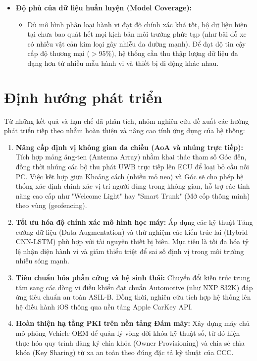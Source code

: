 \begin{itemize}
    \item \textbf{Độ phủ của dữ liệu huấn luyện (Model Coverage):}
    \begin{itemize}
        \item Dù mô hình phân loại hành vi đạt độ chính xác khá tốt, bộ dữ liệu hiện tại chưa bao quát hết mọi kịch bản môi trường phức tạp (như bãi đỗ xe có nhiều vật cản kim loại gây nhiễu đa đường mạnh). Để đạt độ tin cậy cấp độ thương mại ($>95\%$), hệ thống cần thu thập lượng dữ liệu đa dạng hơn từ nhiều mẫu hành vi và thiết bị di động khác nhau.
    \end{itemize}
\end{itemize}

\section*{Định hướng phát triển}

Từ những kết quả và hạn chế đã phân tích, nhóm nghiên cứu đề xuất các hướng phát triển tiếp theo nhằm hoàn thiện và nâng cao tính ứng dụng của hệ thống:

\begin{enumerate}
    \item \textbf{Nâng cấp định vị không gian đa chiều (AoA và nhúng trực tiếp):} Tích hợp mảng ăng-ten (Antenna Array) nhằm khai thác tham số Góc đến, đồng thời nhúng các bộ thu phát UWB trực tiếp lên ECU để loại bỏ cầu nối PC. Việc kết hợp giữa Khoảng cách (nhiều mỏ neo) và Góc sẽ cho phép hệ thống xác định chính xác vị trí người dùng trong không gian, hỗ trợ các tính năng cao cấp như "Welcome Light" hay "Smart Trunk" (Mở cốp thông minh) theo vùng (geofencing).
    
    \item \textbf{Tối ưu hóa độ chính xác mô hình học máy:} Áp dụng các kỹ thuật Tăng cường dữ liệu (Data Augmentation) và thử nghiệm các kiến trúc lai (Hybrid CNN-LSTM) phù hợp với tài nguyên thiết bị biên. Mục tiêu là tối đa hóa tỷ lệ nhận diện hành vi và giảm thiểu triệt để sai số định vị trong môi trường nhiễu sóng mạnh.
    
    \item \textbf{Tiêu chuẩn hóa phần cứng và hệ sinh thái:} Chuyển đổi kiến trúc trung tâm sang các dòng vi điều khiển đạt chuẩn Automotive (như NXP S32K) đáp ứng tiêu chuẩn an toàn ASIL-B. Đồng thời, nghiên cứu tích hợp hệ thống lên hệ điều hành iOS thông qua nền tảng Apple CarKey API.
    
    \item \textbf{Hoàn thiện hạ tầng PKI trên nền tảng Đám mây:} Xây dựng máy chủ mô phỏng Vehicle OEM để quản lý vòng đời khóa kỹ thuật số, từ đó hiện thực hóa quy trình đăng ký chìa khóa (Owner Provisioning) và chia sẻ chìa khóa (Key Sharing) từ xa an toàn theo đúng đặc tả kỹ thuật của CCC.
\end{enumerate}